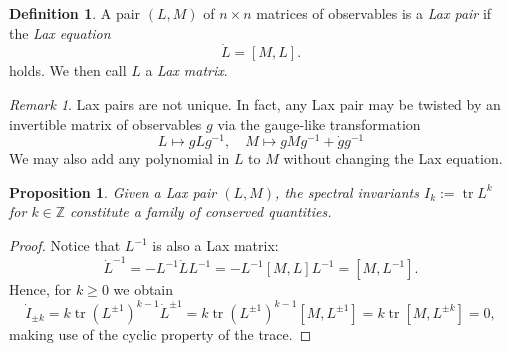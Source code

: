 \documentclass[11pt]{report}
\newtheorem{prop}[theorem]{Proposition}
\theoremstyle{definition}
\newtheorem{definition}[theorem]{Definition}
\theoremstyle{remark}
\newtheorem*{remark}{Remark}
\theoremstyle{remark}
\newcommand{\Z}{\mathbb{Z}}
\begin{document}
\begin{definition} 
A pair $(L,M)$ of $n \times n$ matrices of observables is a \emph{Lax pair} if the \emph{Lax equation}
\begin{equation*}
\dot L = [M,L].
\end{equation*}
holds. We then call $L$ a \emph{Lax matrix}.
\end{definition}

\begin{remark}
Lax pairs are not unique. In fact, any Lax pair may be twisted by an invertible matrix of observables $g$ via the gauge-like transformation
\begin{equation*}
L \mapsto gLg^{-1}, \quad M \mapsto gMg^{-1} + \dot g g^{-1}
\end{equation*}
We may also add any polynomial in $L$ to $M$ without changing the Lax equation.
\end{remark}

\begin{prop}
Given a Lax pair $(L,M)$, the spectral invariants $I_k := \operatorname{tr} L^k$ for $k \in \Z$ constitute a family of conserved quantities.
\end{prop}

\begin{proof}
Notice that $L^{-1}$ is also a Lax matrix:
\begin{equation*}
\dot L^{-1} = - L^{-1} \dot L L^{-1} = -L^{-1} [M,L] L^{-1} = [M,L^{-1}].
\end{equation*}
Hence, for $k \geq 0$ we obtain
\begin{equation*}
\dot I_{\pm k} = k \operatorname{tr} (L^{\pm 1})^{k-1} \dot L^{\pm 1} = k \operatorname{tr} (L^{\pm 1})^{k-1} [M,L^{\pm 1}] = k \operatorname{tr} [M,L^{\pm k}] = 0,
\end{equation*}
making use of the cyclic property of the trace.
\end{proof}
\end{document}
